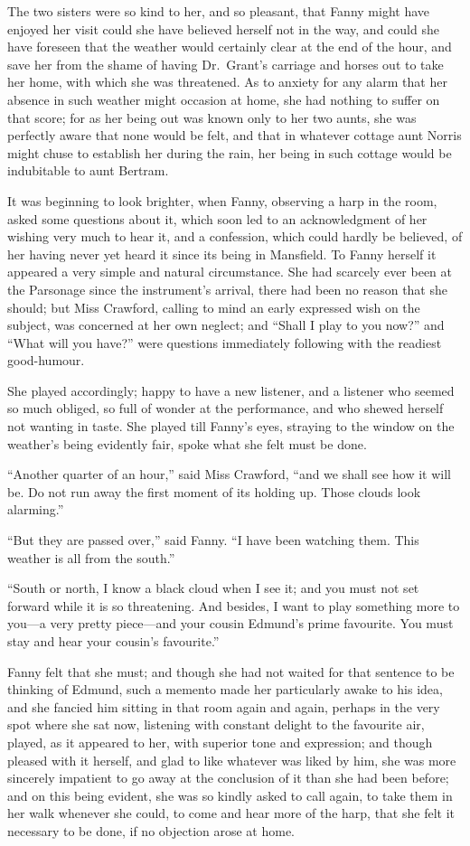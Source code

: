 \documentclass{article}
\begin{document}
The two sisters were so kind to her, and so pleasant,
that Fanny might have enjoyed her visit could she have
believed herself not in the way, and could she have
foreseen that the weather would certainly clear at the
end of the hour, and save her from the shame of having
Dr.\ Grant's carriage and horses out to take her home,
with which she was threatened.  As to anxiety for any alarm
that her absence in such weather might occasion at home,
she had nothing to suffer on that score; for as her being
out was known only to her two aunts, she was perfectly
aware that none would be felt, and that in whatever cottage
aunt Norris might chuse to establish her during the rain,
her being in such cottage would be indubitable to aunt Bertram.

It was beginning to look brighter, when Fanny,
observing a harp in the room, asked some questions about it,
which soon led to an acknowledgment of her wishing very
much to hear it, and a confession, which could hardly
be believed, of her having never yet heard it since its
being in Mansfield.  To Fanny herself it appeared a very
simple and natural circumstance.  She had scarcely ever
been at the Parsonage since the instrument's arrival,
there had been no reason that she should; but Miss Crawford,
calling to mind an early expressed wish on the subject,
was concerned at her own neglect; and ``Shall I play
to you now?'' and ``What will you have?'' were questions
immediately following with the readiest good-humour.

She played accordingly; happy to have a new listener,
and a listener who seemed so much obliged, so full
of wonder at the performance, and who shewed herself
not wanting in taste.  She played till Fanny's eyes,
straying to the window on the weather's being evidently fair,
spoke what she felt must be done.

``Another quarter of an hour,'' said Miss Crawford, ``and we
shall see how it will be.  Do not run away the first
moment of its holding up.  Those clouds look alarming.''

``But they are passed over,'' said Fanny.  ``I have been
watching them.  This weather is all from the south.''

``South or north, I know a black cloud when I see it;
and you must not set forward while it is so threatening.
And besides, I want to play something more to you---a very
pretty piece---and your cousin Edmund's prime favourite.
You must stay and hear your cousin's favourite.''

Fanny felt that she must; and though she had not
waited for that sentence to be thinking of Edmund,
such a memento made her particularly awake to his idea,
and she fancied him sitting in that room again and again,
perhaps in the very spot where she sat now, listening with
constant delight to the favourite air, played, as it
appeared to her, with superior tone and expression;
and though pleased with it herself, and glad to like whatever
was liked by him, she was more sincerely impatient to go
away at the conclusion of it than she had been before;
and on this being evident, she was so kindly asked to
call again, to take them in her walk whenever she could,
to come and hear more of the harp, that she felt it
necessary to be done, if no objection arose at home.
\end{document}
